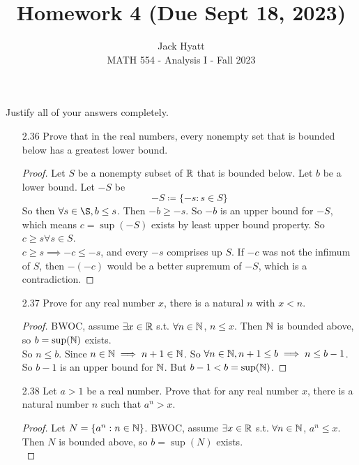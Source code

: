 \documentclass[14pt]{extarticle}
\begin{document}
	
	
	
	\title{Homework 4 (Due Sept 18, 2023)}
	\author{Jack Hyatt\\ %
		MATH 554 - Analysis I - Fall 2023} 
	
	\maketitle
	
	Justify all of your answers completely.\\
	
	
	\medskip 
	
	\begin{enumerate}
		\item[2.36] Prove that in the real numbers, every nonempty set that is bounded below has a greatest lower bound.
		\begin{proof}
			Let $S$ be a nonempty subset of $\mathbb{R}$ that is bounded below. Let $b$ be a lower bound. Let $-S$ be \[-S \coloneq \{-s : s \in S\}\]
			So then $\forall s \in \S, b \leq s$. Then $-b \geq -s$. So $-b$ is an upper bound for $-S$, which means $c=\sup(-S)$ exists by least upper bound property. So $c \geq s \forall s \in S$.\\
			$c \geq s \implies -c \leq -s$, and every $-s$ comprises up $S$. If $-c$ was not the infimum of $S$, then $-(-c)$ would be a better supremum of $-S$, which is a contradiction.
		\end{proof}
		\item[2.37] Prove for any real number $x$, there is a natural $n$ with $x<n$.
		\begin{proof}
			BWOC, assume $\exists x \in \mathbb{R}$ s.t. $\forall n \in \mathbb{N}$, $n \leq x$. Then $\mathbb{N}$ is bounded above, so $b=\sup(\mathbb{N})$ exists.\\
			So $n \leq b$. Since $n \in \mathbb{N} \implies n+1 \in \mathbb{N}$. So $\forall n \in \mathbb{N}, n+1 \leq b \implies n \leq b-1$.\\
			So $b-1$ is an upper bound for $\mathbb{N}$. But $b-1 < b = \sup(\mathbb{N})$. \contra
		\end{proof}
		\item[2.38] Let $a>1$ be a real number. Prove that for any real number $x$, there is a natural number $n$ such that $a^n>x$.
		\begin{proof}
			Let $N = \{a^n : n \in \mathbb{N}\}$. BWOC, assume $\exists x \in \mathbb{R}$ s.t. $\forall n \in \mathbb{N}$, $a^n \leq x$. Then $N$ is bounded above, so $b=\sup(N)$ exists.\\

\end{proof}
\end{enumerate}
\end{document}
